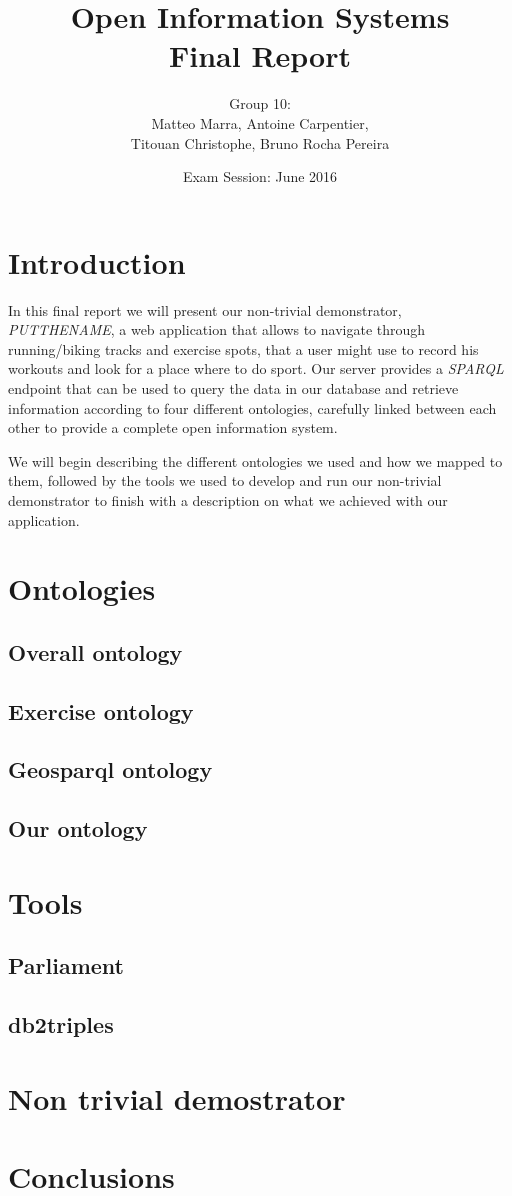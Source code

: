 \documentclass[11pt,a4paper]{article}
\author{Group 10: \\ Matteo Marra, Antoine Carpentier, \\Titouan Christophe, Bruno Rocha Pereira}
\title{Open Information Systems \\ Final Report}
\date{Exam Session: June 2016}
\begin{document}
\maketitle
\section{Introduction}
In this final report we will present our non-trivial demonstrator, \textit{PUTTHENAME}, a web application that allows to navigate through running/biking tracks and exercise spots, that a user might use to record his workouts and look for a place where to do sport.
Our server provides a \textit{SPARQL} endpoint that can be used to query the data in our database and retrieve information according to four different ontologies, carefully linked between each other to provide a complete open information system.

We will begin describing the different ontologies we used and how we mapped to them, followed by the tools we used to develop and run our non-trivial demonstrator to finish with a description on what we achieved with our application.
\section{Ontologies}
\subsection{Overall ontology}
\subsection{Exercise ontology}
\subsection{Geosparql ontology}
\subsection{Our ontology}
\section{Tools}
\subsection{Parliament}
\subsection{db2triples}
\section{Non trivial demostrator}
\section{Conclusions}
\end{document}
